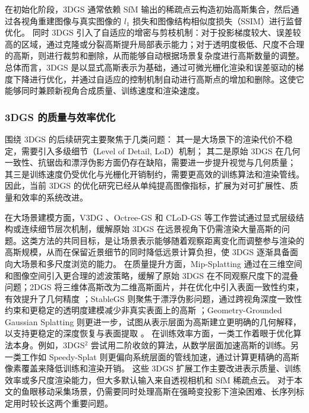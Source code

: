在初始化阶段，3DGS 通常依赖 SfM 输出的稀疏点云构造初始高斯集合，然后通过各视角重建图像与真实图像的 \(l_1\) 损失和图像结构相似度损失（SSIM）进行监督优化。
同时 3DGS 引入了自适应的增密与剪枝机制：对于投影梯度较大、误差较高的区域，通过克隆或分裂高斯提升局部表示能力；对于透明度极低、尺度不合理的高斯，则进行裁剪和删除，从而能够自动根据场景复杂度进行高斯数量的调整。
总体而言，3DGS 是以显式高斯表示为基础，通过可微光栅化渲染和误差驱动的梯度下降进行优化，并通过自适应的控制机制自动进行高斯点的增加和删除。这使它能够同时兼顾新视角合成质量、训练速度和渲染速度。

\subsubsection{3DGS 的质量与效率优化}

围绕 3DGS 的后续研究主要聚焦于几类问题：
其一是大场景下的渲染代价不稳定，需要引入多级细节（Level of Detail, LoD）机制；
其二是原始 3DGS 在几何一致性、抗锯齿和漂浮伪影方面仍存在缺陷，需要进一步提升视觉与几何质量；
其三是训练速度仍受优化与光栅化开销制约，需要更高效的训练算法和渲染管线。因此，当前 3DGS 的优化研究已经从单纯提高图像指标，扩展为对可扩展性、质量和效率的系统改进。

在大场景建模方面，V3DG \cite{yang2025v3dg}、Octree-GS \cite{ren2024octree} 和 CLoD-GS \cite{cheng2025clodgs} 等工作尝试通过显式层级结构或连续细节层次机制，缓解原始 3DGS 在远景视角下仍需渲染大量高斯的问题。这类方法的共同目标，是让场景表示能够随着观察距离变化而调整参与渲染的高斯规模，从而在保留近景细节的同时降低远景计算负担，使 3DGS 逐渐具备面向大场景和多尺度浏览的能力。
在质量提升方面，Mip-Splatting \cite{yu2024mipsplatting} 通过在三维空间和图像空间引入更合理的滤波策略，缓解了原始 3DGS 在不同观察尺度下的混叠问题；2DGS 将三维体高斯改为二维高斯面片，并在优化中引入表面一致性约束，有效提升了几何精度 \cite{huang2024twodgs}；StableGS 则聚焦于漂浮伪影问题，通过跨视角深度一致性约束和更稳定的透明度建模减少非真实表面上的高斯 \cite{wang2025stablegs}；Geometry-Grounded Gaussian Splatting 则更进一步，试图从表示层面为高斯建立更明确的几何解释，以支持更稳定的深度恢复与表面提取 \cite{zhang2026geometrygroundedgs}。
在训练效率方面，一类工作着眼于优化算法本身。例如，3DGS$^2$ \cite{lan20253dgs2} 尝试用二阶收敛的算法，从数学层面加速高斯的训练。另一类工作如 Speedy-Splat \cite{hanson2025speedy} 则更偏向系统层面的管线加速，通过计算更精确的高斯像素覆盖来降低训练和渲染开销。
这些 3DGS 扩展工作主要改进表示质量、训练效率或多尺度渲染能力，但大多默认输入来自透视相机和 SfM 稀疏点云。
对于本文的鱼眼移动采集场景，仍需要同时处理高斯在强畸变投影下渲染困难、长序列标定用时较长这两个重要问题。

